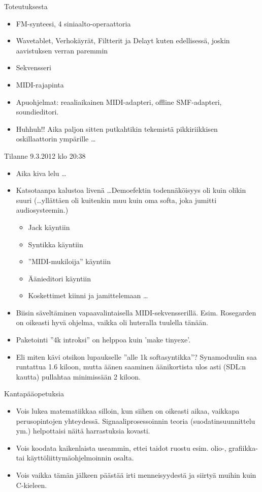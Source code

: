 \documentclass{beamer}
\begin{document}
\begin{frame}{Toteutuksesta}
\begin{itemize}
\item
  FM-synteesi, 4 siniaalto-operaattoria
\item
  Wavetablet, Verhokäyrät, Filtterit ja Delayt kuten edellisessä,
  joskin aavistuksen verran paremmin
\item 
  Sekvensseri
\item 
  MIDI-rajapinta
\item
  Apuohjelmat: reaaliaikainen MIDI-adapteri, offline
  SMF-adapteri, soundieditori.
\item
  Huhhuh!! Aika paljon sitten putkahtikin tekemistä pikkiriikkisen
  oskillaattorin ympärille \ldots
\end{itemize}
\end{frame}


\begin{frame}{Tilanne 9.3.2012 klo 20:38}
  \begin{itemize}
  \item
    Aika kiva lelu \ldots
  \item
    Katsotaanpa kalustoa livenä \ldots Demoefektin todennäköisyys oli
    kuin olikin suuri (\ldots yllättäen oli kuitenkin muu kuin oma
    softa, joka jumitti audiosysteemin.)
    \begin{itemize}
    \item Jack käyntiin
    \item Syntikka käyntiin
    \item ''MIDI-mukiloija'' käyntiin
    \item Äänieditori käyntiin
    \item Koskettimet kiinni ja jamittelemaan \ldots
    \end{itemize}
  \item Biisin säveltäminen vapaavalintaisella
    MIDI-sekvensserillä. Esim. Rosegarden on oikeasti hyvä ohjelma,
    vaikka oli huteralla tuulella tänään.
  \item Paketointi ''4k introksi'' on helppoa kuin 'make tinyexe'.
  \item Eli miten kävi otsikon lupaukselle ''alle 1k softasyntikka''?
    Synamoduulin saa runtattua 1.6 kiloon, mutta äänen saaminen
    äänikortista ulos asti (SDL:n kautta) pullahtaa minimissään 2
    kiloon.
  \end{itemize}
\end{frame}

\begin{frame}{Kantapääopetuksia}
\begin{itemize}
\item Vois lukea matematiikkaa silloin, kun siihen on oikeasti aikaa,
  vaikkapa perusopintojen yhteydessä. Signaaliprosessoinnin teoria
  (suodatinsuunnittelu ym.) helpottaisi näitä harrastuksia kovasti.
\item
  Vois koodata kaikenlaista useammin, ettei taidot ruostu esim. olio-,
  grafiikka- tai käyttöliittymäohjelmoinnin osalta.
\item
  Vois vaikka tämän jälkeen päästää irti menneisyydestä ja siirtyä
  muihin kuin C-kieleen.
\end{itemize}
\end{frame}
\end{document}
